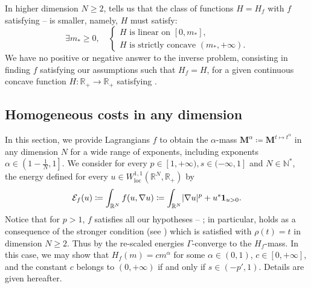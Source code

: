 \documentclass[JEP,XML,SOM,Unicode,published]{cedram}
\theoremstyle{plain}
\theoremstyle{definition}
\newcommand{\N}{\mathbb{N}}
\newcommand{\R}{\mathbb{R}}
\newcommand{\ener}{\mathcal{E}}
\newcommand{\mass}{\boldsymbol{M}}
\newcommand{\loc}{\mathrm{loc}}
\DeclarePairedDelimiter{\abs}{\lvert}{\rvert}
\begin{document}
In higher dimension \(N\geq 2\),  tells us that the class of functions \(H=H_f\) with \(f\) satisfying -- is smaller, namely, $H$ must satisfy:
\begin{equation}
\label{conditionInverseProblemHigher}
\exists m_\ast\geq 0, \quad
\begin{cases}
H\text{ is linear on }[0,m_\ast],\\
H\text{ is strictly concave }(m_\ast,+\infty).
\end{cases}
\end{equation}
We have no positive or negative answer to the inverse problem, consisting in finding \(f\) satisfying our assumptions such that \(H_f=H\), for a given continuous concave function $H:\R_+\to\R_+$ satisfying .

\subsection{Homogeneous costs in any dimension}\label{homogeneousCosts}

In this section, we provide Lagrangians $f$ to obtain the $\alpha$-mass $\mass^\alpha \coloneqq \mass^{t\mapsto t^\alpha}$ in any dimension $N$ for a wide range of exponents, including exponents $\alpha \in \left(1-\frac 1N,1\right]$. We consider for every $p \in [1,+\infty),s \in (-\infty,1]$ and $N\in \N^\ast$, the energy defined for every $u\in W^{1,1}_{\loc}(\R^N,\R_+)$ by
\begin{equation}\label{energy_homogeneous_case}
\ener_f(u) \coloneqq \int_{\R^N} f(u,\nabla u) \coloneqq \int_{\R^N} \abs{\nabla u}^p + u^s\mathbf{1}_{u>0}.
\end{equation}
Notice that for $p>1$, $f$ satisfies all our hypotheses -- ; in particular,  holds as a consequence of the stronger condition  (see ) which is satisfied with $\rho(t) = t$ in dimension $N\geq 2$. Thus by  the re-scaled energies $\Gamma$-converge to the $H_{f}$-mass. In this case, we may show that $H_f(m)=cm^\alpha$ for some $\alpha\in(0,1)$, $c\in [0, +\infty]$, and the constant $c$ belongs to $(0,+\infty)$ if and only if $s\in (-p',1)$. Details are given hereafter.
\end{document}
